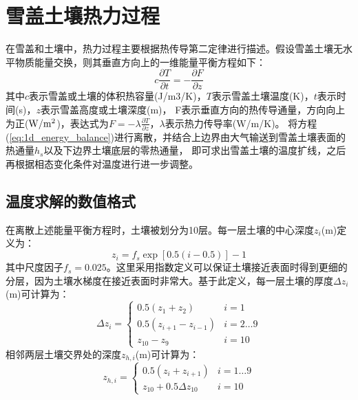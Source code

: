 \chapter{雪盖土壤热力过程}


在雪盖和土壤中，热力过程主要根据热传导第二定律进行描述。假设雪盖土壤无水平物质能量交换，则其垂直方向上的一维能量平衡方程如下：
\begin{equation}\label{eq:1d_energy_balance}
c \frac{\partial T}{\partial t}=-\frac{\partial F}{\partial z}
\end{equation}
其中$c$表示雪盖或土壤的体积热容量(J/m3/K)，$T$表示雪盖土壤温度(K)，$t$表示时间(s)，$z$表示雪盖高度或土壤深度(m)，
F表示垂直方向的热传导通量，方向向上为正($\rm W/m^2$)，表达式为$F=-\lambda\frac{\partial T}{\partial z}$，$\lambda$表示热力传导率(W/m/K)。
将方程(\ref{eq:1d_energy_balance})进行离散，并结合上边界由大气输送到雪盖土壤表面的热通量$h_s$以及下边界土壤底层的零热通量，
即可求出雪盖土壤的温度扩线，之后再根据相态变化条件对温度进行进一步调整。
\section{温度求解的数值格式}\label{温度求解的数值格式}
在离散上述能量平衡方程时，土壤被划分为10层。每一层土壤的中心深度$z_i$(m)定义为：
\begin{equation}
z_{i}=f_{s} \exp [0.5(i-0.5)]-1
\end{equation}
%
其中尺度因子$f_s=0.025$。这里采用指数定义可以保证土壤接近表面时得到更细的分层，因为土壤水梯度在接近表面时非常大。基于此定义，每一层土壤的厚度$\Delta z_i$(m)可计算为：
\begin{equation}
\Delta z_{i}=\left\{\begin{array}{ll}0.5\left(z_{1}+z_{2}\right) & i=1 \\ 0.5\left(z_{i+1}-z_{i-1}\right) & i=2 \ldots 9 \\ z_{10}-z_{9} & i=10\end{array}\right.
\end{equation}
相邻两层土壤交界处的深度$z_{h,i}$(m)可计算为：
\begin{equation}
z_{h, i}=\left\{\begin{array}{ll}0.5\left(z_{i}+z_{i+1}\right) & i=1 \ldots 9 \\ z_{10}+0.5 \Delta z_{10} & i=10\end{array}\right.
\end{equation}


